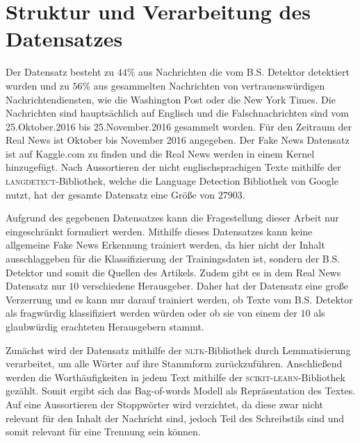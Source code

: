 \chapter{Struktur und Verarbeitung des Datensatzes}

Der Datensatz besteht zu $44\%$ aus Nachrichten die vom B.S. Detektor detektiert wurden und zu $56\%$ aus gesammelten 
Nachrichten von vertrauenswürdigen Nachrichtendiensten, wie die Washington Post oder die New York Times. Die Nachrichten 
sind hauptsächlich auf Englisch und die Falschnachrichten sind vom 25.Oktober.2016 bis 25.November.2016 gesammelt worden. Für den Zeitraum 
der Real News ist Oktober bis November 2016 angegeben. 
Der Fake News Datensatz ist auf Kaggle.com zu finden\cite{fake_data} und die Real News werden in einem Kernel hinzugefügt\cite{real_data}.
Nach Aussortieren der nicht englischsprachigen Texte mithilfe der \textsc{langdetect}-Bibliothek\cite{langdetect}, welche die
Language Detection Bibliothek von Google\cite{google_langdetect} nutzt, hat der gesamte Datensatz eine Größe von 
$\num{27903}$.

Aufgrund des gegebenen Datensatzes kann die Fragestellung dieser Arbeit nur eingeschränkt formuliert werden.
Mithilfe dieses Datensatzes kann keine allgemeine Fake News Erkennung trainiert werden, da hier nicht der Inhalt 
ausschlaggeben für die Klassifizierung der Trainingsdaten ist, sondern der B.S. Detektor und somit die Quellen des 
Artikels. 
Zudem gibt es in dem Real News Datensatz nur $10$ verschiedene Herausgeber.
Daher hat der Datensatz eine große Verzerrung und es kann nur darauf trainiert werden, ob Texte vom B.S. Detektor 
als fragwürdig klassifiziert werden würden oder ob sie von einem der $10$ als glaubwürdig erachteten Herausgebern stammt.

Zunächst wird der Datensatz mithilfe der \textsc{nltk}-Bibliothek\cite{nltk} durch Lemmatisierung verarbeitet, um 
alle Wörter auf ihre Stammform zurückzuführen. 
Anschließend werden die Worthäufigkeiten in jedem Text mithilfe der \textsc{scikit-learn}-Bibliothek\cite{scikit-learn} 
gezählt. 
Somit ergibt sich das Bag-of-words Modell als Repräsentation des Textes.
Auf eine Aussortieren der Stoppwörter wird verzichtet, da diese zwar nicht relevant für den Inhalt der Nachricht sind,
jedoch Teil des Schreibstils sind und somit relevant für eine Trennung sein können.

